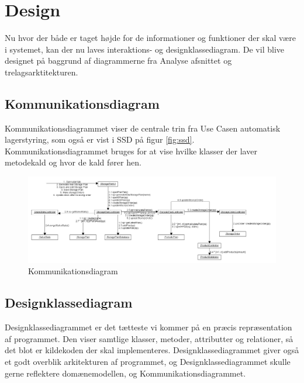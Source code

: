 \chapter{Design}\label{ch:design}
Nu hvor der både er taget højde for de informationer og funktioner der skal være i systemet, kan der nu laves interaktions- og designklassediagram. De vil blive designet på baggrund af diagrammerne fra Analyse afsnittet og trelagsarktitekturen. 

\section{Kommunikationsdiagram}
Kommunikationsdiagrammet viser de centrale trin fra Use Casen automatisk lagerstyring, som også er vist i SSD på figur \ref{fig:ssd}. Kommunikationsdiagrammet bruges for at vise hvilke klasser der laver metodekald og hvor de kald fører hen.

\begin{landscape}
\begin{figure}
    \centering
    \includegraphics[width=\hsize]{figures/design/Kommunikationsdiagram.png}
    \caption{Kommunikationsdiagram}
    \label{fig:Kommunikationsdiagram}
\end{figure}
\end{landscape}

\section{Designklassediagram}
Designklassediagrammet er det tætteste vi kommer på en præcis repræsentation af programmet. Den viser samtlige klasser, metoder, attributter og relationer, så det blot er kildekoden der skal implementeres. Designklassediagrammet giver også et godt overblik arkitekturen af programmet, og Designklassediagrammet skulle gerne reflektere domænemodellen, og Kommunikationsdiagrammet.

